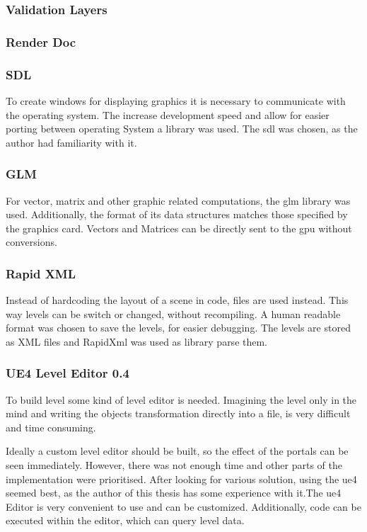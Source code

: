 \subsubsection{Validation Layers}

\subsubsection{Render Doc}

\subsubsection{SDL}
To create windows for displaying graphics it is necessary to communicate with the operating system. The increase development speed and allow for easier porting between operating System a library was used. The \gls{sdl} \cite{sdl} was chosen, as the author had familiarity with it.

\subsubsection{GLM}
For vector, matrix and other graphic related computations, the \gls{glm} library \cite{glm} was used. Additionally, the format of its data structures matches those specified by the graphics card. Vectors and Matrices can be directly sent to the \gls{gpu} without conversions.


\subsubsection{Rapid XML}
Instead of hardcoding the layout of a scene in code, files are used instead. This way levels can be switch or changed, without recompiling. A human readable format was chosen to save the levels, for easier debugging. The levels are stored as XML files and RapidXml \cite{rapidxml} was used as library parse them.

\subsubsection{UE4 Level Editor 0.4}
To build level some kind of level editor is needed. Imagining the level only in the mind and writing the objects transformation directly into a file, is very difficult and time consuming.

Ideally a custom level editor should be built, so the effect of the portals can be seen immediately. However, there was not enough time and other parts of the implementation were prioritised. After looking for various solution, using the \gls{ue4} \cite{ue4} seemed best, as the author of this thesis has some experience with it.The \gls{ue4} Editor is very convenient to use and can be customized. Additionally, code can be executed within the editor, which can query level data.

